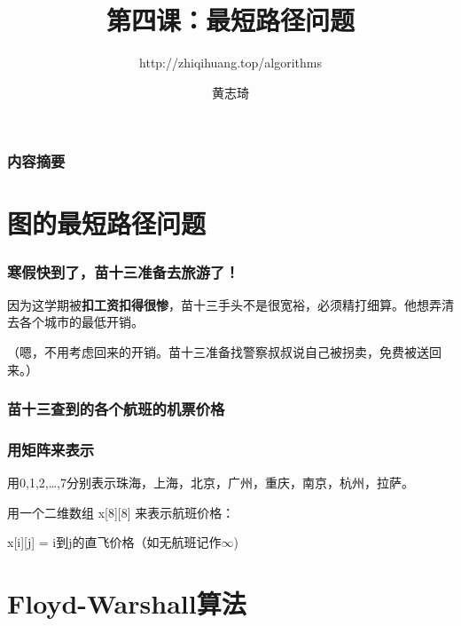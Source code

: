 \documentclass[CJK,14pt]{beamer}
\begin{document}
\bch

\title{第四课：最短路径问题}
\subtitle{http://zhiqihuang.top/algorithms}
  \author{黄志琦}
  \date{}

  \maketitle

  \begin{frame}
    \frametitle{内容摘要}
  \tableofcontents
  \end{frame}

  \section{图的最短路径问题}

  \begin{frame}
    \frametitle{寒假快到了，苗十三准备去旅游了！}


    因为这学期被{\bf 扣工资扣得很惨}，苗十三手头不是很宽裕，必须精打细算。他想弄清去各个城市的最低开销。

    {\scriptsize（嗯，不用考虑回来的开销。苗十三准备找警察叔叔说自己被拐卖，免费被送回来。）}


  \end{frame}


  \begin{frame}
    \frametitle{苗十三查到的各个航班的机票价格}
  \end{frame}
  

  \begin{frame}
    \frametitle{用矩阵来表示}
    用0,1,2,\ldots,7分别表示珠海，上海，北京，广州，重庆，南京，杭州，拉萨。

    \skiplines
    
    用一个二维数组 x[8][8] 来表示航班价格：

    \skiplines
    
    x[i][j] = i到j的直飞价格（如无航班记作$\infty$)

  \end{frame}

  \section{Floyd-Warshall算法}
\end{document}
